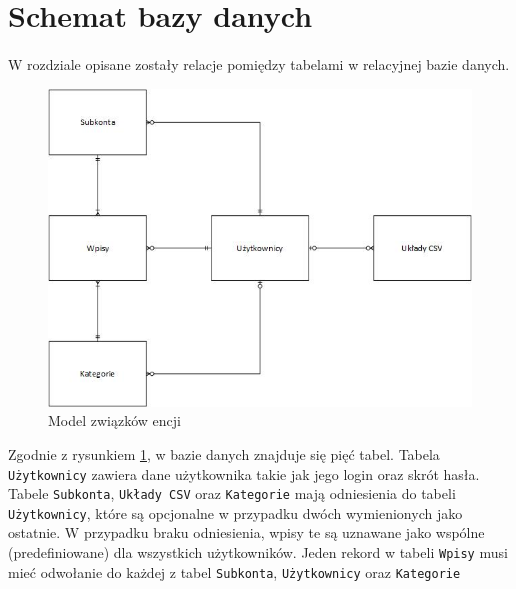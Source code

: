 \documentclass{article}
\begin{document}
	\section{Schemat bazy danych}
	\paragraph{} W rozdziale opisane zostały relacje pomiędzy tabelami w relacyjnej bazie danych. 
	\begin{figure}[H]
		\centering
		\includegraphics[width=0.8\linewidth]{assets/er.jpg}
		\caption[]{Model związków encji}
		\label{fig:er}
	\end{figure}
	
	Zgodnie z rysunkiem \ref{fig:er}, w bazie danych znajduje się pięć tabel. Tabela \texttt{Użytkownicy} zawiera dane użytkownika takie jak jego login oraz skrót hasła. Tabele \texttt{Subkonta}, \texttt{Układy CSV} oraz \texttt{Kategorie} mają odniesienia do tabeli \texttt{Użytkownicy}, które są opcjonalne w przypadku dwóch wymienionych jako ostatnie. W przypadku braku odniesienia, wpisy te są uznawane jako wspólne (predefiniowane) dla wszystkich użytkowników. Jeden rekord w tabeli \texttt{Wpisy} musi mieć odwołanie do każdej z tabel \texttt{Subkonta}, \texttt{Użytkownicy} oraz \texttt{Kategorie}
	
	
\end{document}
